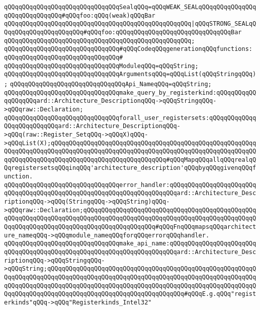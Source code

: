 \newline
\verb|qQQqqQQqqQQqqQQqqQQqqQQqqQQqqQQqSealqQQq=qQQqWEAK_SEALqQQqqQQqqQQqqQQqqQQqqQQqqQQqqQQq#qQQqfoo:qQQq(weak)qQQqBar|\newline
\verb|qQQqqQQqqQQqqQQqqQQqqQQqqQQqqQQqqQQqqQQqqQQqqQQqqQQq|\verb#|qQQqSTRONG_SEALqQQqqQQqqQQqqQQqqQQqqQQq#\verb|#qQQqfoo:qQQqqQQqqQQqqQQqqQQqqQQqqQQqqQQqBar|\newline
\verb|qQQqqQQqqQQqqQQqqQQqqQQqqQQqqQQqqQQqqQQqqQQqqQQqqQQq;|\newline
\newline
\verb|qQQqqQQqqQQqqQQqqQQqqQQqqQQqqQQq#qQQqCodeqQQqgenerationqQQqfunctions:|\newline
\verb|qQQqqQQqqQQqqQQqqQQqqQQqqQQqqQQq#|\newline
\verb|qQQqqQQqqQQqqQQqqQQqqQQqqQQqqQQqModuleqQQq=qQQqString;|\newline
\verb|qQQqqQQqqQQqqQQqqQQqqQQqqQQqqQQqArgumentsqQQq=qQQqList(qQQqStringqQQq);|\newline
\verb|qQQqqQQqqQQqqQQqqQQqqQQqqQQqqQQqApi_NameqQQq=qQQqString;|\newline
\newline
\verb|qQQqqQQqqQQqqQQqqQQqqQQqqQQqqQQqmake_query_by_registerkind:qQQqqQQqqQQqqQQqqQQqard::Architecture_DescriptionqQQq->qQQqStringqQQq->qQQqraw::Declaration;|\newline
\verb|qQQqqQQqqQQqqQQqqQQqqQQqqQQqqQQqforall_user_registersets:qQQqqQQqqQQqqQQqqQQqqQQqqQQqard::Architecture_DescriptionqQQq->qQQq(raw::Register_SetqQQq->qQQqX)qQQq->qQQqList(X);qQQqqQQqqQQqqQQqqQQqqQQqqQQqqQQqqQQqqQQqqQQqqQQqqQQqqQQqqQQqqQQqqQQqqQQqqQQqqQQqqQQqqQQqqQQqqQQqqQQqqQQqqQQqqQQqqQQqqQQqqQQqqQQqqQQqqQQqqQQqqQQqqQQqqQQqqQQqqQQqqQQqqQQqqQQq#qQQqMapqQQqallqQQqrealqQQqregistersetsqQQqinqQQq'architecture_description'qQQqbyqQQqgivenqQQqfunction.|\newline
\newline
\newline
\verb|qQQqqQQqqQQqqQQqqQQqqQQqqQQqqQQqerror_handler:qQQqqQQqqQQqqQQqqQQqqQQqqQQqqQQqqQQqqQQqqQQqqQQqqQQqqQQqqQQqqQQqqQQqqQQqard::Architecture_DescriptionqQQq->qQQq(StringqQQq->qQQqString)qQQq->qQQqraw::Declaration;qQQqqQQqqQQqqQQqqQQqqQQqqQQqqQQqqQQqqQQqqQQqqQQqqQQqqQQqqQQqqQQqqQQqqQQqqQQqqQQqqQQqqQQqqQQqqQQqqQQqqQQqqQQqqQQqqQQqqQQqqQQqqQQqqQQqqQQqqQQqqQQqqQQqqQQqqQQqqQQq#qQQqFnqQQqmapsqQQqarchitecture_nameqQQq->qQQqmodule_nameqQQqforqQQqerrorqQQqhandler.|\newline
\newline
\verb|qQQqqQQqqQQqqQQqqQQqqQQqqQQqqQQqmake_api_name:qQQqqQQqqQQqqQQqqQQqqQQqqQQqqQQqqQQqqQQqqQQqqQQqqQQqqQQqqQQqqQQqqQQqqQQqard::Architecture_DescriptionqQQq->qQQqStringqQQq->qQQqString;qQQqqQQqqQQqqQQqqQQqqQQqqQQqqQQqqQQqqQQqqQQqqQQqqQQqqQQqqQQqqQQqqQQqqQQqqQQqqQQqqQQqqQQqqQQqqQQqqQQqqQQqqQQqqQQqqQQqqQQqqQQqqQQqqQQqqQQqqQQqqQQqqQQqqQQqqQQqqQQqqQQqqQQqqQQqqQQqqQQqqQQqqQQqqQQqqQQqqQQqqQQqqQQqqQQqqQQqqQQqqQQqqQQqqQQqqQQqqQQqqQQqqQQq#qQQqE.g.qQQq"registerkinds"qQQq->qQQq"Registerkinds_Intel32"|\newline

